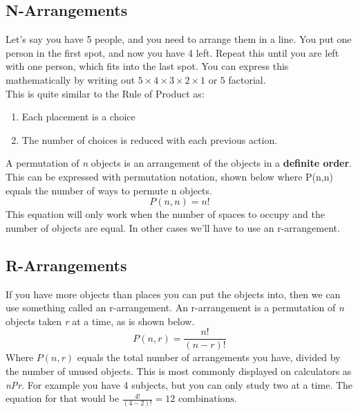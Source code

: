 \documentclass[final,1p,12pt]{elsarticle}
\begin{document}
    \subsection{N-Arrangements}
    Let's say you have 5 people, and you need to arrange them in a line.
    You put one person in the first spot, and now you have 4 left. Repeat this until you are left with one person, which fits into the last spot. You can express this mathematically by writing out $5\times4\times3\times2\times1$ or $5$ factorial.\\
    This is quite similar to the Rule of Product as:
    \begin{enumerate}
        \item Each placement is a choice
        \item The number of choices is reduced with each previous action. 
    \end{enumerate}
    A permutation of \emph{n} objects is an arrangement of the objects in a \textbf{definite order}. This can be expressed with permutation notation, shown below where P(n,n) equals the number of ways to permute n objects.
    \begin{equation}
        P(n,n) = n!
    \end{equation}
    This equation will only work when the number of spaces to occupy and the number of objects are equal. In other cases we'll have to use an r-arrangement.
    
    \subsection{R-Arrangements}
    If you have more objects than places you can put the objects into, then we can use something called an r-arrangement. An r-arrangement is a permutation of \emph{n} objects taken \emph{r} at a time, as is shown below.
    \begin{equation}
       P(n,r) = \frac{n!}{(n-r)!} 
    \end{equation}
    Where $P(n,r)$ equals the total number of arrangements you have, divided by the number of unused objects. This is most commonly displayed on calculators as \emph{nPr}. For example you have 4 subjects, but you can only study two at a time. The equation for that would be $\frac{4!}{(4-2)!}=12\mbox{ combinations.}$ 
\clearpage
    
\end{document}
